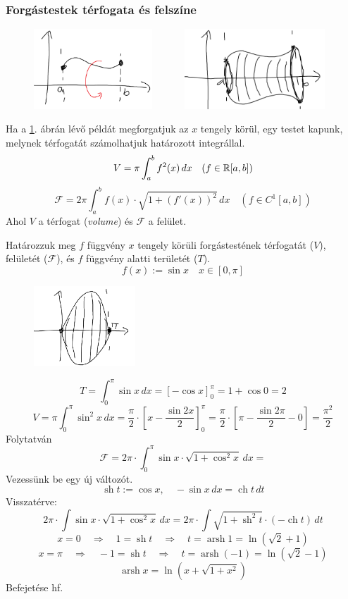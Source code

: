 \documentclass[a4paper,11.5pt]{article}
\DeclareMathOperator{\sh}{sh}
\DeclareMathOperator{\ch}{ch}
\DeclareMathOperator{\arsh}{arsh}
\begin{document}
	\subsubsection{Forgástestek térfogata és felszíne}
	\begin{revision}
		\begin{figure}[H]
			\centering
			\includegraphics[height=3cm]{../2zh/kepek/15pre.png}$\quad \quad \quad $
			\includegraphics[height=3cm]{../2zh/kepek/15.png}
			\caption{}\label{rotation}
		\end{figure}
		Ha a \ref{rotation}. ábrán lévő példát megforgatjuk az $x$ tengely körül, egy testet kapunk, melynek térfogatát számolhatjuk határozott integrállal.
		\[ V=\pi\int_a^bf^2(x)\,dx\quad (f\in\mathbb{R}[a,b]) \]
		\[ \mathcal{F}=2\pi\int_a^bf(x)\cdot\sqrt{1+(f'(x))^2}\,dx\quad (f\in C^1[a,b]) \]
		Ahol $V$ a térfogat (\textit{volume}) és $\mathcal{F}$ a felület.
	\end{revision}
	\begin{example} Határozzuk meg $f$ függvény $x$ tengely körüli forgástestének térfogatát ($V$), felületét ($\mathcal{F}$), és $f$ függvény alatti területét ($T$).
		\[ f(x):=\sin x\quad x\in[0,\pi]\]
		\begin{figure}[H]
			\centering
			\includegraphics[height=3cm]{../2zh/kepek/16.png}
			\caption{}
		\end{figure}
		\vspace{-6mm}
		\[ T=\int_0^\pi\sin x\,dx=\left[-\cos x\right]_0^\pi=1+\cos 0=2 \]
		\[ V=\pi\int_0^\pi\sin^2x\,dx=\frac{\pi}{2}\cdot\left[x-\frac{\sin2x}{2}\right]_0^\pi=\frac{\pi}{2}\cdot\left[\pi-\frac{\sin2\pi}{2}-0\right]=\frac{\pi^2}{2} \]
		Folytatván
		\[ \mathcal{F}=2\pi\cdot\int_0^\pi \sin x\cdot\sqrt{ 1+\cos^2x}\,dx= \]
		Vezessünk be egy új változót.
		\[ \sh t:=\cos x,\quad -\sin x\,dx=\ch t\,dt \]
		Visszatérve:
		\[ 2\pi\cdot\int \sin x\cdot\sqrt{ 1+\cos^2x}\,dx=2\pi\cdot\int\sqrt{1+\sh^2t}\cdot(-\ch t)\,dt \]
		\[ x=0\quad \Rightarrow\quad 1=\sh t\quad \Rightarrow\quad t=\arsh 1=\ln(\sqrt{2}+1) \]
		\[ x=\pi\quad \Rightarrow\quad -1=\sh t\quad \Rightarrow\quad t=\arsh (-1)=\ln(\sqrt{2}-1) \]
		\[ \arsh x=\ln(x+\sqrt{1+x^2}) \]
		Befejetése hf.
	\end{example}
\end{document}
